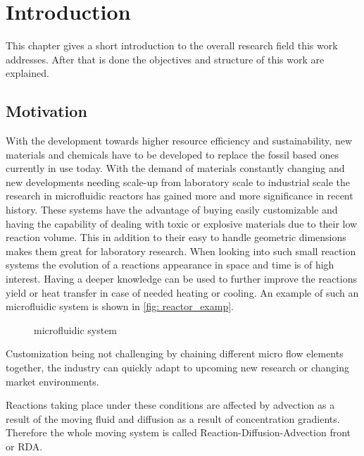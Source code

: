 \documentclass[../thesis.tex]{subfiles}
\begin{document}
\chapter{Introduction}
\label{chp:introduction}

This chapter gives a short introduction to the overall research field this work addresses. After that is done the objectives and structure of this work are explained.

\section{Motivation}

With the development towards higher resource efficiency and sustainability, new materials and chemicals have to be developed to replace the fossil based ones currently in use today. With the demand of materials constantly changing and new developments needing scale-up from laboratory scale to industrial scale the research in microfluidic reactors has gained more and more significance in recent history. These systems have the advantage of buying easily customizable and having the capability of dealing with toxic or explosive materials due to their low reaction volume. This in addition to their easy to handle geometric dimensions makes them great for laboratory research. When looking into such small reaction systems the evolution of a reactions appearance in space and time is of high interest. Having a deeper knowledge can be used to further improve the reactions yield or heat transfer in case of needed heating or cooling. An example of such an microfluidic system is shown in \autoref{fig: reactor_examp}. 
\begin{figure}[htb]
	\centering
	\qquad
	\caption{microfluidic system \cite{corning}}%
	\label{fig: reactor_examp}%
\end{figure}
Customization being not challenging by chaining different micro flow elements together, the industry can quickly adapt to upcoming new research or changing market environments.

Reactions taking place under these conditions are affected by advection as a result of the moving fluid and diffusion as a result of concentration gradients. Therefore the whole moving system is called Reaction-Diffusion-Advection front or RDA.
\end{document}

